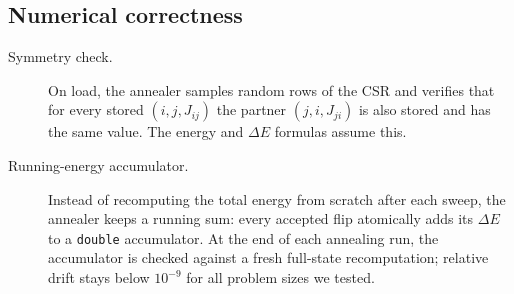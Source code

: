\documentclass[pdflatex,sn-apa]{sn-jnl}%
\theoremstyle{thmstyleone}%
\theoremstyle{thmstyletwo}%
\theoremstyle{thmstylethree}%
\newcommand{\dE}{\Delta E}
\begin{document}
\begin{appendices}
\subsection{Numerical correctness}\label{sec:sa-scaffolding}

\begin{description}
\item[Symmetry check.] On load, the annealer samples random rows of the CSR and verifies that for every stored $(i, j, J_{ij})$ the partner $(j, i, J_{ji})$ is also stored and has the same value. The energy and $\dE$ formulas assume this.
\item[Running-energy accumulator.] Instead of recomputing the total energy from scratch after each sweep, the annealer keeps a running sum: every accepted flip atomically adds its $\dE$ to a \texttt{double} accumulator. At the end of each annealing run, the accumulator is checked against a fresh full-state recomputation; relative drift stays below $10^{-9}$ for all problem sizes we tested.
\end{description}

\end{appendices}

\end{document}
